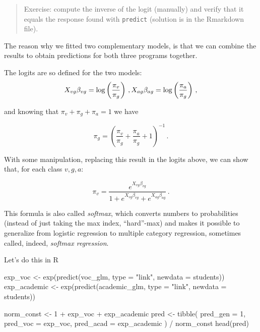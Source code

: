 \documentclass[
  oneside]{book}
\newenvironment{Shaded}{\begin{snugshade}}{\end{snugshade}}
\newcommand{\AttributeTok}[1]{\textcolor[rgb]{0.77,0.63,0.00}{#1}}
\newcommand{\DecValTok}[1]{\textcolor[rgb]{0.00,0.00,0.81}{#1}}
\newcommand{\FunctionTok}[1]{\textcolor[rgb]{0.00,0.00,0.00}{#1}}
\newcommand{\NormalTok}[1]{#1}
\newcommand{\OtherTok}[1]{\textcolor[rgb]{0.56,0.35,0.01}{#1}}
\newcommand{\SpecialCharTok}[1]{\textcolor[rgb]{0.00,0.00,0.00}{#1}}
\newcommand{\StringTok}[1]{\textcolor[rgb]{0.31,0.60,0.02}{#1}}
\begin{document}
\begin{quote}
Exercise: compute the inverse of the logit (manually) and verify that
it equals the response found with \texttt{predict} (solution is in the Rmarkdown
file).
\end{quote}

The reason why we fitted two complementary models, is that we can combine
the results to obtain predictions for both three programs together.

The logits are so defined for the two models:
\[
X_{vg}\beta_{vg} = \log\left(\frac{\pi_{v}}{\pi_g}\right)\,,\\
X_{ag}\beta_{ag} = \log\left(\frac{\pi_{a}}{\pi_g}\right)\,,
\]

and knowing that \(\pi_v + \pi_g + \pi_a = 1\)
we have

\[
\pi_g = \left(\frac{\pi_v}{\pi_g} + \frac{\pi_a}{\pi_g} + 1\right)^{-1}\,.
\]

With some manipulation, replacing this result in the
logits above, we can show that, for each class \(v, g, a\):

\[
\pi_v = \frac{e^{X_{vg}\beta_{vg}}}{1 + e^{X_{vg}\beta_{vg}} + e^{X_{ag}\beta_{ag}}}\,.
\]

This formula is also called \emph{softmax}, which converts numbers to probabilities (instead
of just taking the max index, ``hard''-max) and makes it possible to generalize
from logistic regression to multiple category regression, sometimes
called, indeed, \emph{softmax regression}.

Let's do this in R

\begin{Shaded}
\begin{Highlighting}[]
\NormalTok{exp\_voc }\OtherTok{\textless{}{-}} \FunctionTok{exp}\NormalTok{(}\FunctionTok{predict}\NormalTok{(voc\_glm, }\AttributeTok{type =} \StringTok{"link"}\NormalTok{, }\AttributeTok{newdata =}\NormalTok{ students))}
\NormalTok{exp\_academic }\OtherTok{\textless{}{-}} \FunctionTok{exp}\NormalTok{(}\FunctionTok{predict}\NormalTok{(academic\_glm, }\AttributeTok{type =} \StringTok{"link"}\NormalTok{, }\AttributeTok{newdata =}\NormalTok{ students))}
\end{Highlighting}
\end{Shaded}

\begin{Shaded}
\begin{Highlighting}[]
\NormalTok{norm\_const }\OtherTok{\textless{}{-}} \DecValTok{1} \SpecialCharTok{+}\NormalTok{ exp\_voc }\SpecialCharTok{+}\NormalTok{ exp\_academic}
\NormalTok{pred }\OtherTok{\textless{}{-}} \FunctionTok{tibble}\NormalTok{(}
  \AttributeTok{pred\_gen =} \DecValTok{1}\NormalTok{, }\AttributeTok{pred\_voc =}\NormalTok{ exp\_voc,}
  \AttributeTok{pred\_acad =}\NormalTok{ exp\_academic}
\NormalTok{) }\SpecialCharTok{/}\NormalTok{ norm\_const}
\FunctionTok{head}\NormalTok{(pred)}
\end{Highlighting}
\end{Shaded}
\end{document}
